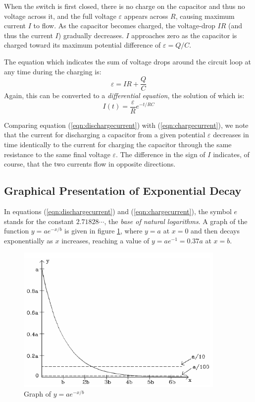 When the switch is first closed, there is no charge on the capacitor and thus no voltage across it, and the full voltage $\varepsilon$ appears across $R$, causing maximum current $I$ to flow. As the capacitor becomes charged, the voltage-drop $IR$ (and thus the current $I$) gradually decreases. $I$ approaches zero as the capacitor is charged toward its maximum potential difference of $\varepsilon = Q/C$. \myskip

The equation which indicates the sum of voltage drops around the circuit loop at any time during the charging is:
\begin{equation}
    \varepsilon = IR + \frac{Q}{C}
\end{equation}
Again, this can be converted to a \emph{differential equation}, the solution of which is:
\begin{equation}
    I(t) = \frac{\varepsilon}{R}e^{-t/RC}
    \label{eqn:chargecurrent}
\end{equation}

Comparing equation (\ref{eqn:dischargecurrent}) with (\ref{eqn:chargecurrent}), we note that the current for discharging a capacitor from a given potential $\varepsilon$ decreases in time identically to the current for charging the capacitor through the same resistance to the same final voltage $\varepsilon$. The difference in the sign of $I$ indicates, of course, that the two currents flow in opposite directions.

\subsection{Graphical Presentation of Exponential Decay}

In equations (\ref{eqn:dischargecurrent}) and (\ref{eqn:chargecurrent}), the symbol $e$ stands for the constant $2.71828\cdots$, the \emph{base of natural logarithms}. A graph of the function $y = ae^{-x/b}$ is given in figure \ref{fig:expgraph}, where $y=a$ at $x=0$ and then decays exponentially as $x$ increases, reaching a value of $y = ae^{-1} = 0.37a$ at $x=b$.

\begin{figure}[h]
    \begin{center}
        \includegraphics[width=0.9\textwidth]{./Exp3/pic/image4.png}
    \end{center}
    \caption{Graph of $y=ae^{-x/b}$}
    \label{fig:expgraph}
\end{figure}

